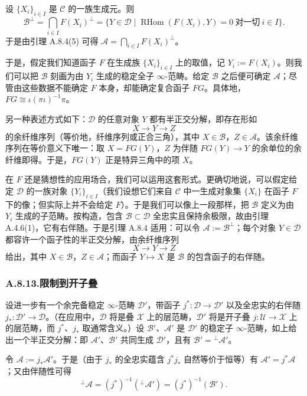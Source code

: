 设 $\{X_i\}_{i\in I}$ 是 $\mathcal C$ 的一族生成元。则
\[
\mathcal B^{\perp}=\bigcap_{i\in I}F(X_i)^{\perp}=\{Y\in\mathcal D\mid \operatorname{RHom}(F(X_i),Y)=0\ \text{对一切}\ i\in I\}.
\]
于是由引理 A.8.4(5) 可得 $\mathcal A=\bigcap_{i\in I}F(X_i)^{\perp}$。

于是，假定我们知道函子 $F$ 在生成族 $\{X_i\}_{i\in I}$ 上的取值，记 $Y_i:=F(X_i)$。则我们可以把 $\mathcal B$ 刻画为由 $Y_i$ 生成的稳定全子 $\infty$-范畴。给定 $\mathcal B$ 之后便可确定 $\mathcal A$；尽管由这些数据不能确定 $F$ 本身，却能确定复合函子 $FG$。具体地，$FG\cong\iota(\pi\iota)^{-1}\pi$。

另一种表述方式如下：$\mathcal D$ 的任意对象 $Y$ 都有半正交分解，即存在形如
\[
X\to Y\to Z
\]
的余纤维序列（等价地，纤维序列或正合三角），其中 $X\in\mathcal B$，$Z\in\mathcal A$。该余纤维序列在等价意义下唯一：取 $X=FG(Y)$，$Z$ 为伴随 $FG(Y)\to Y$ 的余单位的余纤维即得。于是，$FG(Y)$ 正是特异三角中的项 $X$。

在 $F$ 还是猜想性的应用场合，我们可以运用这套形式。更确切地说，可以假定给定 $\mathcal D$ 的一族对象 $\{Y_i\}_{i\in I}$（我们设想它们来自 $\mathcal C$ 中一生成对象集 $\{X_i\}$ 在函子 $F$ 下的像；但实际上并不会给定 $F$）。于是我们可以像上一段那样，把 $\mathcal B$ 定义为由 $Y_i$ 生成的子范畴。按构造，包含 $\mathcal B\subset\mathcal D$ 全忠实且保持余极限，故由引理 A.4.6(1)，它有右伴随。于是引理 A.8.4 适用：可以令 $\mathcal A:=\mathcal B^{\perp}$；每个对象 $Y\in\mathcal D$ 都容许一个函子性的半正交分解，由余纤维序列
\[
X\to Y\to Z
\]
给出，其中 $X\in\mathcal B$，$Z\in\mathcal A$；而函子 $Y\mapsto X$ 是 $\mathcal B$ 的包含函子的右伴随。

\subsubsection*{A.8.13.\quad 限制到开子叠}
设进一步有一个余完备稳定 $\infty$-范畴 $\mathcal D'$，带函子 $j^*:\mathcal D\to\mathcal D'$ 以及全忠实的右伴随 $j_*:\mathcal D'\to\mathcal D$。（在应用中，$\mathcal D$ 将是叠 $\mathcal X$ 上的层范畴，$\mathcal D'$ 将是开子叠 $j:\mathcal U\to\mathcal X$ 上的层范畴，而 $j^*$、$j_*$ 取通常含义。）设 $\mathcal B'$、$\mathcal A'$ 是 $\mathcal D'$ 的稳定子 $\infty$-范畴，如上给出一个半正交分解：即 $\mathcal A'$、$\mathcal B'$ 共同生成 $\mathcal D'$，且有 $\mathcal B'={}^{\perp}\mathcal A'$。

令 $\mathcal A:=j_*\mathcal A'$。于是（由于 $j_*$ 的全忠实蕴含 $j^*j_*$ 自然等价于恒等）有 $\mathcal A'=j^*\mathcal A$；又由伴随性可得
\begin{equation}\tag{A.8.14}\label{eq:a4-18-1}
{}^{\perp}\mathcal A=(j^*)^{-1}({}^{\perp}\mathcal A')=(j^*)^{-1}(\mathcal B').
\end{equation}

